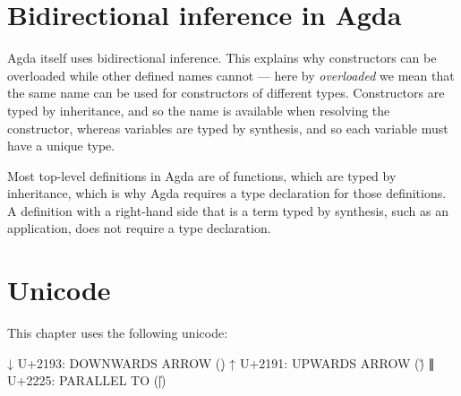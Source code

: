 \hypertarget{bidirectional-inference-in-agda}{%
\section{Bidirectional inference in
Agda}\label{bidirectional-inference-in-agda}}

Agda itself uses bidirectional inference. This explains why constructors
can be overloaded while other defined names cannot --- here by
\emph{overloaded} we mean that the same name can be used for
constructors of different types. Constructors are typed by inheritance,
and so the name is available when resolving the constructor, whereas
variables are typed by synthesis, and so each variable must have a
unique type.

Most top-level definitions in Agda are of functions, which are typed by
inheritance, which is why Agda requires a type declaration for those
definitions. A definition with a right-hand side that is a term typed by
synthesis, such as an application, does not require a type declaration.

\begin{fence}
\begin{code}%
\>[0]\AgdaSpace{}%
\AgdaSymbol{=}\AgdaSpace{}%
\AgdaSpace{}%
\AgdaOperator{\AgdaPrimitive{*}}\AgdaSpace{}%
\<%
\end{code}
\end{fence}

\hypertarget{unicode}{%
\section{Unicode}\label{unicode}}

This chapter uses the following unicode:

\begin{myDisplay}
↓  U+2193:  DOWNWARDS ARROW (\d)
↑  U+2191:  UPWARDS ARROW (\u)
∥  U+2225:  PARALLEL TO (\||)
\end{myDisplay}

